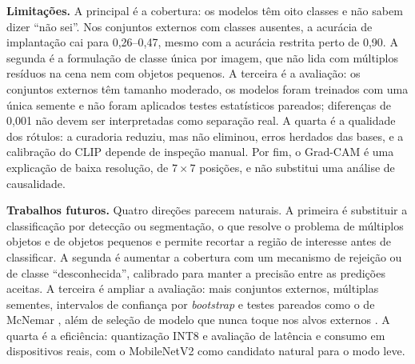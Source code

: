 \documentclass[11pt,a4paper]{article}
\begin{document}
	\textbf{Limitações.} A principal é a cobertura: os modelos têm oito classes e não sabem dizer ``não sei''. Nos conjuntos externos com classes ausentes, a acurácia de implantação cai para 0,26--0,47, mesmo com a acurácia restrita perto de 0,90. A segunda é a formulação de classe única por imagem, que não lida com múltiplos resíduos na cena nem com objetos pequenos. A terceira é a avaliação: os conjuntos externos têm tamanho moderado, os modelos foram treinados com uma única semente e não foram aplicados testes estatísticos pareados; diferenças de 0,001 não devem ser interpretadas como separação real. A quarta é a qualidade dos rótulos: a curadoria reduziu, mas não eliminou, erros herdados das bases, e a calibração do CLIP depende de inspeção manual. Por fim, o Grad-CAM é uma explicação de baixa resolução, de $7 \times 7$ posições, e não substitui uma análise de causalidade.
	
	\textbf{Trabalhos futuros.} Quatro direções parecem naturais. A primeira é substituir a classificação por detecção ou segmentação, o que resolve o problema de múltiplos objetos e de objetos pequenos e permite recortar a região de interesse antes de classificar. A segunda é aumentar a cobertura com um mecanismo de rejeição ou de classe ``desconhecida'', calibrado para manter a precisão entre as predições aceitas. A terceira é ampliar a avaliação: mais conjuntos externos, múltiplas sementes, intervalos de confiança por \emph{bootstrap} e testes pareados como o de McNemar \cite{dietterich1998}, além de seleção de modelo que nunca toque nos alvos externos \cite{gulrajani2021}. A quarta é a eficiência: quantização INT8 e avaliação de latência e consumo em dispositivos reais, com o MobileNetV2 como candidato natural para o modo leve.
	
\end{document}
